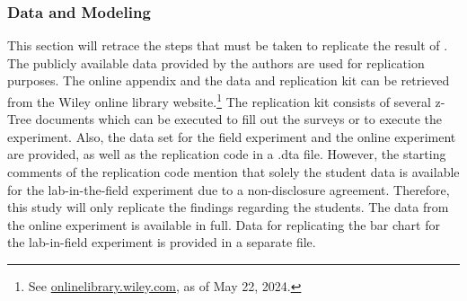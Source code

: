 \documentclass[12pt]{article}
\begin{document}
\subsubsection{Data and Modeling} \label{subsubsection:data_modeling}
This section will retrace the steps that must be taken to replicate the result of \textcite{Kirchler2018}. The publicly available data provided by the authors are used for replication purposes.
The online appendix and the data and replication kit can be retrieved from the Wiley online library website.\footnote{
See \href{https://onlinelibrary.wiley.com/doi/abs/10.1111/jofi.12701}{onlinelibrary.wiley.com}, as of May 22, 2024.}
The replication kit consists of several z-Tree documents which can be executed to fill out the surveys or to execute the experiment. Also, the data set for the field experiment and the online experiment are provided, as well as the replication code in a .dta file. However, the starting comments of the replication code mention that solely the student data is available for the lab-in-the-field experiment due to a non-disclosure agreement. Therefore, this study will only replicate the findings regarding the students. The data from the online experiment is available in full. Data for replicating the bar chart for the lab-in-field experiment is provided in a separate file.
\par
\end{document}
